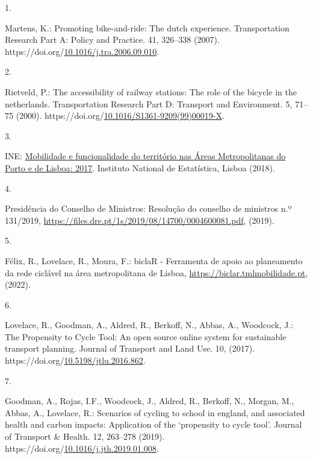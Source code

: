 \documentclass[runningheads]{llncs}
\newlength{\cslhangindent}
\newlength{\csllabelwidth}
\newlength{\cslentryspacingunit} %
\newenvironment{CSLReferences}[2] %
 {%
  \setlength{\parindent}{0pt}
  \ifodd #1
  \let\oldpar\par
  \def\par{\hangindent=\cslhangindent\oldpar}
  \fi
  \setlength{\parskip}{#2\cslentryspacingunit}
 }%
 {}
\newcommand{\CSLLeftMargin}[1]{\parbox[t]{\csllabelwidth}{#1}}
\newcommand{\CSLRightInline}[1]{\parbox[t]{\linewidth - \csllabelwidth}{#1}\break}
\begin{document}
\hypertarget{refs}{}
\begin{CSLReferences}{0}{0}
\leavevmode{}%
\CSLLeftMargin{1. }%
\CSLRightInline{Martens, K.: Promoting bike-and-ride: The dutch
experience. Transportation Research Part A: Policy and Practice. 41,
326--338 (2007).
https://doi.org/\href{https://doi.org/10.1016/j.tra.2006.09.010}{10.1016/j.tra.2006.09.010}.}

\leavevmode{}%
\CSLLeftMargin{2. }%
\CSLRightInline{Rietveld, P.: The accessibility of railway stations: The
role of the bicycle in the netherlands. Transportation Research Part D:
Transport and Environment. 5, 71--75 (2000).
https://doi.org/\href{https://doi.org/10.1016/S1361-9209(99)00019-X}{10.1016/S1361-9209(99)00019-X}.}

\leavevmode{}%
\CSLLeftMargin{3. }%
\CSLRightInline{INE:
\href{https://www.ine.pt/xportal/xmain?xpid=INE\&xpgid=ine_publicacoes\&PUBLICACOESpub_boui=349495406\&PUBLICACOESmodo=2\&xlang=pt}{Mobilidade
e funcionalidade do território nas {Áreas Metropolitanas do Porto e de
Lisboa}: 2017}. {Instituto National de Estatística}, Lisboa (2018).}

\leavevmode{}%
\CSLLeftMargin{4. }%
\CSLRightInline{Presidência do Conselho de Ministros: Resolução do
conselho de ministros n.º 131/2019,
\url{https://files.dre.pt/1s/2019/08/14700/0004600081.pdf}, (2019).}

\leavevmode{}%
\CSLLeftMargin{5. }%
\CSLRightInline{Félix, R., Lovelace, R., Moura, F.: {biclaR - Ferramenta
de apoio ao planeamento da rede ciclável na área metropolitana de
Lisboa}, \url{https://biclar.tmlmobilidade.pt}, (2022).}

\leavevmode{}%
\CSLLeftMargin{6. }%
\CSLRightInline{Lovelace, R., Goodman, A., Aldred, R., Berkoff, N.,
Abbas, A., Woodcock, J.: The Propensity to Cycle Tool: An open source
online system for sustainable transport planning. Journal of Transport
and Land Use. 10, (2017).
https://doi.org/\href{https://doi.org/10.5198/jtlu.2016.862}{10.5198/jtlu.2016.862}.}

\leavevmode{}%
\CSLLeftMargin{7. }%
\CSLRightInline{Goodman, A., Rojas, I.F., Woodcock, J., Aldred, R.,
Berkoff, N., Morgan, M., Abbas, A., Lovelace, R.: Scenarios of cycling
to school in england, and associated health and carbon impacts:
Application of the {`}propensity to cycle tool{'}. Journal of Transport
\& Health. 12, 263--278 (2019).
https://doi.org/\href{https://doi.org/10.1016/j.jth.2019.01.008}{10.1016/j.jth.2019.01.008}.}


\end{CSLReferences}
\end{document}
